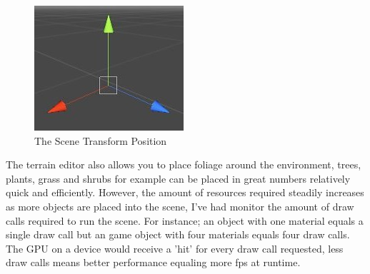 \begin{figure}[!ht]
	\caption{The Scene Transform Position}
	\centering
	\includegraphics{img/transform.jpg}
\end{figure}

The terrain editor also allows you to place foliage around the environment, trees, plants, grass and shrubs for example can be placed in great numbers relatively quick and efficiently. However, the amount of resources required steadily increases as more objects are placed into the scene, I've had monitor the amount of draw calls required to run the scene. For instance; an object with one material equals a single draw call but an game object with four materials equals four draw calls. The GPU on a device would receive a 'hit' for every draw call requested, less draw calls means better performance equaling more fps at runtime.
